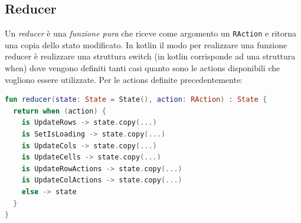 \subsection{Reducer}
Un \emph{reducer} è una \emph{funzione pura} che riceve come argomento un \verb|RAction| e ritorna una copia dello stato modificato. In kotlin il modo per realizzare una funzione reducer è realizzare una struttura switch (in kotlin corrisponde ad una struttura when) dove vengono definiti tanti casi quanto sono le actions disponibili che vogliono essere utilizzate. Per le actions definite precedentemente:
\begin{lstlisting}[caption={Interfaccia Thunk}, label={lst:bodycells}, language=Kotlin]
fun reducer(state: State = State(), action: RAction) : State {
  return when (action) {
    is UpdateRows -> state.copy(...)
    is SetIsLoading -> state.copy(...)
    is UpdateCols -> state.copy(...)
    is UpdateCells -> state.copy(...)
    is UpdateRowActions -> state.copy(...)
    is UpdateColActions -> state.copy(...)
    else -> state
  }
}
\end{lstlisting}



